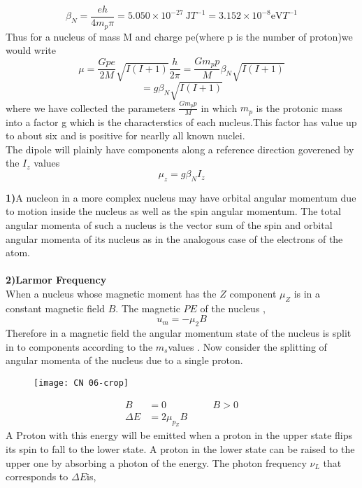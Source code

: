 \begin{enumerate}
\begin{enumerate}
$$\beta_N=\frac{eh}{4m_p \pi}=5.050 \times 10^{-2 7} \mathrm{~J}{T}^{-1}=3.152 \times 10^{-8} \mathrm{eV} T^{-1}$$
Thus for a nucleus of mass M and charge pe(where p is the number of proton)we would write\\
$$\mu=\frac{Gpe}{2M}\sqrt{I(I+1)}\frac{h}{2 \pi}=\frac{Gm_pp}{M}\beta_N\sqrt{I(I+1)}$$
$$=g\beta_N\sqrt{I(I+1)}$$
where we have collected the parameters $\frac{Gm_pp}{M}$ in which $m_p$ is the protonic mass into a factor g which is the characterstics of each nucleus.This factor has value up to about six and is positive for nearlly all known nuclei.\\
The dipole will plainly have components along a reference direction goverened by the $I_z$ values\\
$$\mu_{z}=g\beta_NI_z$$
\end{enumerate}
\begin{note}	
 \textbf{1)}\quad A nucleon in a more complex nucleus may have orbital angular momentum  due to motion inside the nucleus as well as the spin angular momentum. The total angular momenta of such a nucleus is the vector sum of the spin and orbital angular momenta of its nucleus as in the analogous case of the electrons of the atom.\\\\
 	\textbf{2)}\quad \textbf{Larmor Frequency}\\
 	When a nucleus whose magnetic moment has the $Z$ component $\mu_{Z}$ is in a constant magnetic field $B$. The magnetic $PE$ of the nucleus ,\\
 	$$u_{m}=-\mu_{2} B$$
 	Therefore in a magnetic field the angular momentum state of the nucleus is split in to components according to the $m_s$values . Now consider the splitting of angular momenta of the nucleus due to a single proton.\\
 	\begin{figure}[H]
 		\centering
 		\texttt{[image: CN 06-crop]}
 		\caption{}
 		\label{}
 	\end{figure}
 	\begin{align*}
 	B&=0\hspace{2cm} B>0\\
 	\Delta E&=2 \mu_{p_{Z}} B
 	\end{align*}
 	A Proton with this energy will be emitted when a proton in the upper state flips its spin to fall to the lower state. A proton in the lower state can be raised to the upper one by absorbing a photon of the energy. The photon frequency $\nu_L$ that corresponds to $\Delta E$is,\\

\end{note}
\end{enumerate}
